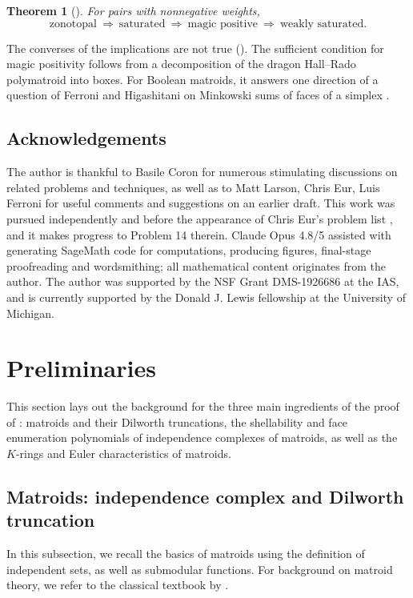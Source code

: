 \documentclass[11pt,a4paper,reqno]{amsart}
\theoremstyle{results}
\theoremstyle{definitions}
\newtheorem{theorem}[thm]{Theorem}
\begin{document}
\begin{theorem}[]
  For pairs with nonnegative weights,
  \[
    \text{zonotopal}\ \Longrightarrow\ \text{saturated}\
    \Longrightarrow\ \text{magic positive}\
    \Longrightarrow\ \text{weakly saturated}.
  \]
\end{theorem}
The converses of the implications are not true (). 
The sufficient condition for magic positivity follows from a decomposition of the dragon
Hall--Rado polymatroid into boxes. For Boolean matroids, it answers one
direction of a question of Ferroni and Higashitani on Minkowski sums of
faces of a simplex \cite{ferroni2024examples}.


\subsection*{Acknowledgements} 
The author is thankful to Basile Coron for numerous stimulating discussions on related problems and techniques, as well as to Matt Larson, Chris Eur, Luis Ferroni for useful comments and suggestions on an earlier draft. 
This work was pursued independently and before the appearance of Chris Eur's
problem list \cite{eur2026problems}, and it makes progress to Problem 14 therein. Claude Opus 4.8/5 assisted with generating SageMath code for computations, producing figures, final-stage proofreading and wordsmithing; all mathematical content originates from the author. The author was supported by the NSF Grant DMS-1926686 at the IAS, 
and is currently supported by the Donald J. Lewis fellowship at the University of Michigan.

\section{Preliminaries}
\label{sec:prelim}
This section lays out the background for the three main ingredients of the proof of : matroids and their Dilworth truncations, the shellability and face enumeration polynomials of
independence complexes of matroids, as well as the $K$-rings and Euler characteristics of matroids.

\subsection{Matroids: independence complex and Dilworth truncation}
\label{sec:prelim-matroids}
In this subsection, we recall the basics of matroids using the definition of independent sets, as well as submodular functions.
For background on matroid theory, we refer to the classical textbook by \cite{oxley2011matroid}.
\end{document}
